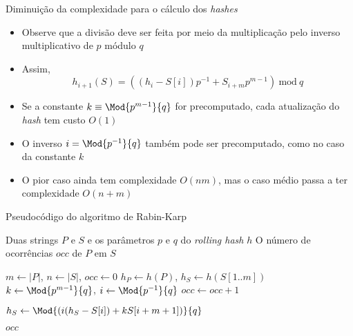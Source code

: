 \begin{frame}[fragile]{Diminuição da complexidade para o cálculo dos {\it hashes}}

    \begin{itemize}
        \item Observe que a divisão deve ser feita por meio da multiplicação pelo inverso
            multiplicativo de $p$ módulo $q$

        \item Assim,
        \[
            h_{i+1}(S) = \left((h_{i} - S[i])p^{-1} + S_{i+m}p^{m -1}\right)\ \mbox{mod}\ q
        \]

        \item Se a constante $k\equiv \Mod{p^{m-1}}{q}$ for precomputado, cada atualização do
            \textit{hash} tem custo $O(1)$

        \item O inverso $i = \Mod{p^{-1}}{q}$ também pode ser precomputado, como no caso da constante $k$

        \item O pior caso ainda tem complexidade $O(nm)$, mas o caso médio passa a ter
            complexidade $O(n + m)$

    \end{itemize}

\end{frame}

\begin{frame}[fragile]{Pseudocódigo do algoritmo de Rabin-Karp}

    \begin{algorithm}[H]
        \caption{Algoritmo de Rabin-Karp com \textit{Rolling Hash}}
        \begin{algorithmic}[1]
            \Require Duas strings $P$ e $S$ e os parâmetros $p$ e $q$ do \textit{rolling hash} $h$
            \Ensure O número de ocorrências $occ$ de $P$ em $S$

                \State $m \gets |P|$, $n \gets |S|$, $occ \gets 0$
                \State $h_P \gets h(P)$, $h_S \gets h(S[1..m])$
                \State $k \gets \Mod{p^{m - 1}}{q}$, $i \gets \Mod{p^{-1}}{q}$
                \State
                            \State $occ \gets occ + 1$
                        \EndIf
                    \EndIf

                        \State $h_S \gets \Mod{\left(i(h_S - S[i]) + kS[i + m + 1]\right)}{q}$
                    \EndIf
                \EndFor

                \State \Return $occ$
            \EndFunction
        \end{algorithmic}
    \end{algorithm}

\end{frame}



 
